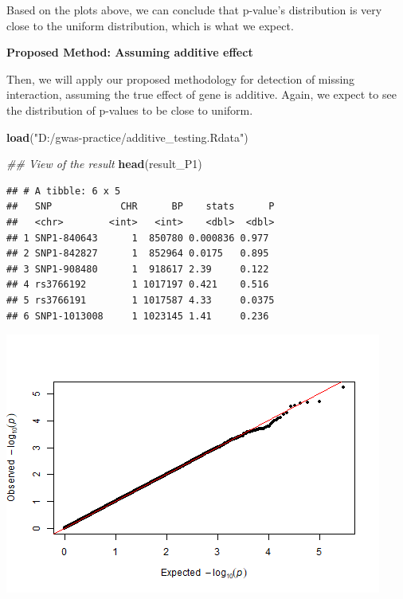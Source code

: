 \documentclass[
]{article}
\newenvironment{Shaded}{\begin{snugshade}}{\end{snugshade}}
\newcommand{\CommentTok}[1]{\textcolor[rgb]{0.56,0.35,0.01}{\textit{#1}}}
\newcommand{\KeywordTok}[1]{\textcolor[rgb]{0.13,0.29,0.53}{\textbf{#1}}}
\newcommand{\NormalTok}[1]{#1}
\newcommand{\OperatorTok}[1]{\textcolor[rgb]{0.81,0.36,0.00}{\textbf{#1}}}
\newcommand{\StringTok}[1]{\textcolor[rgb]{0.31,0.60,0.02}{#1}}
\begin{document}
Based on the plots above, we can conclude that p-value's distribution is
very close to the uniform distribution, which is what we expect.

\clearpage

\textbf{Proposed Method: Assuming additive effect}

Then, we will apply our proposed methodology for detection of missing
interaction, assuming the true effect of gene is additive. Again, we
expect to see the distribution of p-values to be close to uniform.

\begin{Shaded}
\begin{Highlighting}[]
\KeywordTok{load}\NormalTok{(}\StringTok{"D:/gwas-practice/additive_testing.Rdata"}\NormalTok{)}

\CommentTok{## View of the result}
\KeywordTok{head}\NormalTok{(result_P1)}
\end{Highlighting}
\end{Shaded}

\begin{verbatim}
## # A tibble: 6 x 5
##   SNP            CHR      BP    stats      P
##   <chr>        <int>   <int>    <dbl>  <dbl>
## 1 SNP1-840643      1  850780 0.000836 0.977 
## 2 SNP1-842827      1  852964 0.0175   0.895 
## 3 SNP1-908480      1  918617 2.39     0.122 
## 4 rs3766192        1 1017197 0.421    0.516 
## 5 rs3766191        1 1017587 4.33     0.0375
## 6 SNP1-1013008     1 1023145 1.41     0.236
\end{verbatim}

\begin{Shaded}
\end{Shaded}

\includegraphics{stats-gene-research-progress-v8_files/figure-latex/unnamed-chunk-3-1.png}
\end{document}
